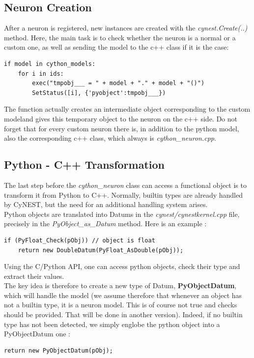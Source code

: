 \documentclass{article}
\begin{document}
\subsection{Neuron Creation}
After a neuron is registered, new instances are created with the \emph{cynest.Create(..)} method.
Here, the main task is to check whether the neuron is a normal or a custom one, as well as sending the model to the c++ class if it is the case:
\begin{verbatim}
if model in cython_models:
    for i in ids:
        exec("tmpobj___ = " + model + "." + model + "()")
        SetStatus([i], {'pyobject':tmpobj___})
\end{verbatim}
The function actually creates an intermediate object corresponding to the custom modeland gives this temporary object to the neuron on the c++ side. Do not forget that for every custom neuron there is, in addition to the python model, also the corresponding c++ class, which always is \emph{cython\_neuron.cpp}.

\subsection{Python - C++ Transformation}
The last step before the \emph{cython\_neuron} class can access a functional object is to transform it from Python to C++. Normally, builtin types are already handled by CyNEST, but the need for an additional handling system arises. \\
Python objects are translated into Datums in the \emph{cynest/cynestkernel.cpp} file, precisely in the \emph{PyObject\_as\_Datum} method. Here is an example :
\begin{verbatim}
if (PyFloat_Check(pObj)) // object is float
    return new DoubleDatum(PyFloat_AsDouble(pObj));
\end{verbatim}
Using the C/Python API, one can access python objects, check their type and extract their values.\\
The key idea is therefore to create a new type of Datum, \textbf{PyObjectDatum}, which will handle the model (we assume therefore that whenever an object has not a builtin type, it is a neuron model. This is of course not true and checks should be provided. That will be done in another version). Indeed, if no builtin type has not been detected, we simply englobe the python object into a PyObjectDatum one :
\begin{verbatim}
return new PyObjectDatum(pObj);
\end{verbatim}
\end{document}
